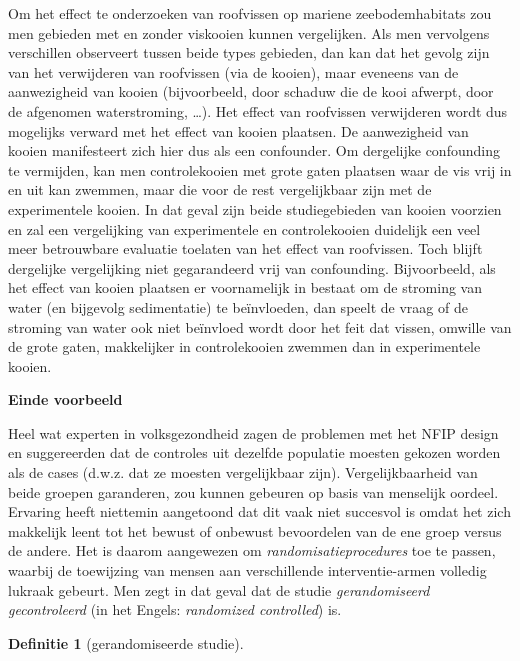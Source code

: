 \documentclass[
  12pt,dutch]{book}
\theoremstyle{definition}
\newtheorem{definition}{Definitie}[chapter]
\theoremstyle{definition}
\theoremstyle{definition}
\theoremstyle{definition}
\theoremstyle{remark}
\begin{document}
Om het effect te onderzoeken van roofvissen op mariene zeebodemhabitats zou men gebieden met en zonder viskooien kunnen vergelijken. Als men vervolgens verschillen observeert tussen beide types gebieden, dan kan dat het gevolg zijn van het verwijderen van roofvissen (via de kooien), maar eveneens van de aanwezigheid van kooien (bijvoorbeeld, door schaduw die de kooi afwerpt, door de afgenomen waterstroming, \ldots). Het effect van roofvissen verwijderen wordt dus mogelijks verward met het effect van kooien plaatsen. De aanwezigheid van kooien manifesteert zich hier dus als een confounder. Om dergelijke confounding te vermijden, kan men controlekooien met grote gaten plaatsen waar de vis vrij in en uit kan zwemmen, maar die voor de rest vergelijkbaar zijn met de experimentele kooien. In dat geval zijn beide studiegebieden van kooien voorzien en zal een vergelijking van experimentele en controlekooien duidelijk een veel meer betrouwbare evaluatie toelaten van het effect van roofvissen. Toch blijft dergelijke vergelijking niet gegarandeerd vrij van confounding. Bijvoorbeeld, als het effect van kooien plaatsen er voornamelijk in bestaat om de stroming van water (en bijgevolg sedimentatie) te beïnvloeden, dan speelt de vraag of de stroming van water ook niet beïnvloed wordt door het feit dat vissen, omwille van de grote gaten, makkelijker in controlekooien zwemmen dan in experimentele kooien.

\textbf{Einde voorbeeld}

Heel wat experten in volksgezondheid zagen de problemen met het NFIP design
en suggereerden dat de controles uit dezelfde populatie moesten gekozen
worden als de cases (d.w.z. dat ze moesten vergelijkbaar zijn).
Vergelijkbaarheid van beide groepen garanderen, zou kunnen gebeuren op basis
van menselijk oordeel. Ervaring heeft niettemin aangetoond dat dit vaak niet
succesvol is omdat het zich makkelijk leent tot het bewust of onbewust
bevoordelen van de ene groep versus de andere. Het is daarom aangewezen om
\emph{randomisatieprocedures} toe te passen, waarbij de toewijzing van
mensen aan verschillende interventie-armen volledig lukraak gebeurt. Men
zegt in dat geval dat de studie \emph{gerandomiseerd gecontroleerd} (in
het Engels: \emph{randomized controlled}) is.

\begin{definition}[gerandomiseerde studie]
\protect\hypertarget{def:unnamed-chunk-69}{}\label{def:unnamed-chunk-69}~
\end{definition}
\end{document}
